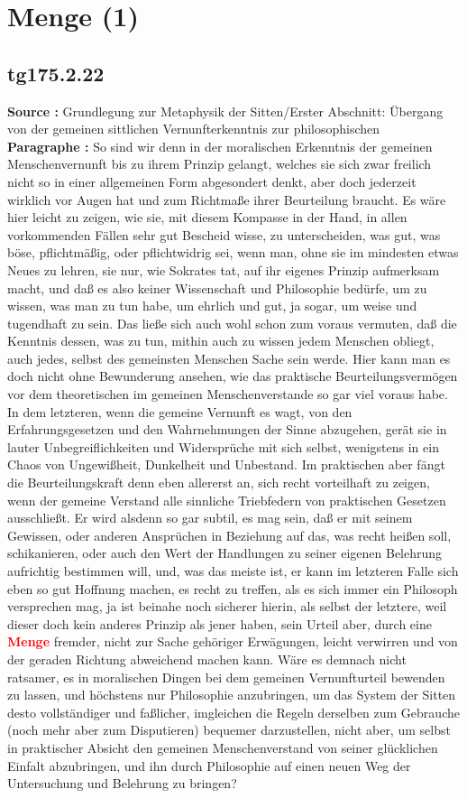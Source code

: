 \documentclass[a4paper,12pt,twoside]{book}
\newcommand{\match}[1]{\textcolor{red}{\textbf{#1}}}
\newcommand{\unnumberedsection}[1]{
	\section*{#1}
	\addcontentsline{toc}{section}{#1}
	\markright{#1}
}
\begin{document}
	\unnumberedsection{Menge (1)} 
	\subsection*{tg175.2.22} 
	\textbf{Source : }Grundlegung zur Metaphysik der Sitten/Erster Abschnitt: Übergang von der gemeinen sittlichen Vernunfterkenntnis zur philosophischen\\  
	
	\noindent\textbf{Paragraphe : }So sind wir denn in der moralischen Erkenntnis der gemeinen Menschenvernunft bis zu ihrem Prinzip gelangt, welches sie sich zwar freilich nicht so in einer allgemeinen  Form abgesondert denkt, aber doch jederzeit wirklich vor Augen hat und zum Richtmaße ihrer Beurteilung braucht. Es wäre hier leicht zu zeigen, wie sie, mit diesem Kompasse in der Hand, in allen vorkommenden Fällen sehr gut Bescheid wisse, zu unterscheiden, was gut, was böse, pflichtmäßig, oder pflichtwidrig sei, wenn man, ohne sie im mindesten etwas Neues zu lehren, sie nur, wie Sokrates tat, auf ihr eigenes Prinzip aufmerksam macht, und daß es also keiner Wissenschaft und Philosophie bedürfe, um zu wissen, was man zu tun habe, um ehrlich und gut, ja sogar, um weise und tugendhaft zu sein. Das ließe sich auch wohl schon zum voraus vermuten, daß die Kenntnis dessen, was zu tun, mithin auch zu wissen jedem Menschen obliegt, auch jedes, selbst des gemeinsten Menschen Sache sein werde. Hier kann man es doch nicht ohne Bewunderung ansehen, wie das praktische Beurteilungsvermögen vor dem theoretischen im gemeinen Menschenverstande so gar viel voraus habe. In dem letzteren, wenn die gemeine Vernunft es wagt, von den Erfahrungsgesetzen und den Wahrnehmungen der Sinne abzugehen, gerät sie in lauter Unbegreiflichkeiten und Widersprüche mit sich selbst, wenigstens in ein Chaos von Ungewißheit, Dunkelheit und Unbestand. Im praktischen aber fängt die Beurteilungskraft denn eben allererst an, sich recht vorteilhaft zu zeigen, wenn der gemeine Verstand alle sinnliche Triebfedern von praktischen Gesetzen ausschließt. Er wird alsdenn so gar subtil, es mag sein, daß er mit seinem Gewissen, oder anderen Ansprüchen in Beziehung auf das, was recht heißen soll, schikanieren, oder auch den Wert der Handlungen zu seiner eigenen Belehrung aufrichtig bestimmen will, und, was das meiste ist, er kann im letzteren Falle sich eben so gut Hoffnung machen, es recht zu treffen, als es sich immer ein Philosoph versprechen mag, ja ist beinahe noch sicherer hierin, als selbst der letztere, weil dieser doch kein anderes Prinzip als jener haben, sein Urteil aber, durch eine \match{Menge} fremder, nicht zur Sache gehöriger Erwägungen, leicht verwirren und von der geraden Richtung abweichend machen kann. Wäre es demnach nicht ratsamer,  es in moralischen Dingen bei dem gemeinen Vernunfturteil bewenden zu lassen, und höchstens nur Philosophie anzubringen, um das System der Sitten desto vollständiger und faßlicher, imgleichen die Regeln derselben zum Gebrauche (noch mehr aber zum Disputieren) bequemer darzustellen, nicht aber, um selbst in praktischer Absicht den gemeinen Menschenverstand von seiner glücklichen Einfalt abzubringen, und ihn durch Philosophie auf einen neuen Weg der Untersuchung und Belehrung zu bringen? 
	
\end{document}

